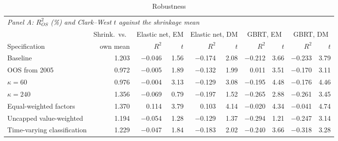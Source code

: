 \begin{table}[!ht]
\centering\footnotesize
\caption{Robustness}
\label{tab:robust}
\begin{tabular}{lrrrrrrrrr}
\toprule
\multicolumn{10}{l}{\textit{Panel A: $R^2_{OS}$ (\%) and Clark--West $t$ against the shrinkage mean}} \\
\addlinespace
 & Shrink.\ vs.\ & \multicolumn{2}{c}{Elastic net, EM} & \multicolumn{2}{c}{Elastic net, DM} & \multicolumn{2}{c}{GBRT, EM} & \multicolumn{2}{c}{GBRT, DM} \\
\cmidrule(lr){3-4}\cmidrule(lr){5-6}\cmidrule(lr){7-8}\cmidrule(lr){9-10}
Specification & own mean & $R^2$ & $t$ & $R^2$ & $t$ & $R^2$ & $t$ & $R^2$ & $t$ \\
\midrule
Baseline & 1.203 & $-$0.046 & 1.56 & $-$0.174 & 2.08 & $-$0.212 & 3.66 & $-$0.233 & 3.79 \\
OOS from 2005 & 0.972 & $-$0.005 & 1.89 & $-$0.132 & 1.99 & 0.011 & 3.51 & $-$0.170 & 3.11 \\
$\kappa = 60$ & 0.976 & $-$0.004 & 3.13 & $-$0.129 & 3.08 & $-$0.195 & 4.48 & $-$0.176 & 4.46 \\
$\kappa = 240$ & 1.356 & $-$0.069 & 0.79 & $-$0.197 & 1.52 & $-$0.265 & 2.88 & $-$0.261 & 3.45 \\
Equal-weighted factors & 1.370 & 0.114 & 3.79 & 0.103 & 4.14 & $-$0.020 & 4.34 & $-$0.041 & 4.74 \\
Uncapped value-weighted & 1.194 & $-$0.054 & 1.28 & $-$0.129 & 1.37 & $-$0.294 & 1.21 & $-$0.247 & 3.14 \\
Time-varying classification & 1.229 & $-$0.047 & 1.84 & $-$0.183 & 2.02 & $-$0.240 & 3.66 & $-$0.318 & 3.28 \\
\bottomrule
\end{tabular}


\end{table}
